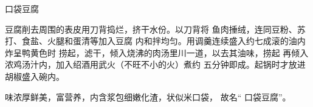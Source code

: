 \begin{recipe}{口袋豆腐}

\ingredients




\cooking

豆腐削去周围的表皮用刀背捣烂，挤干水份。以刀背将 鱼肉捶绒，连同豆粉、苏打、食盐、火腿和蛋清等加入豆腐 内和拌均匀。用调羹连续盛入约七成滚的油内炸呈鸭黄色时 捞起，滤干，倾入烧沸的肉汤里川一道，以去其油味，捞起 再倾入浓鸡汤汁内，加入绍酒用武火（不旺不小的火）煮约 五分钟即成。起锅时才放进胡椒盛入碗内。

\notes

味浓厚鲜美，富营养，内含浆包细嫩化渣，状似米口袋， 故名“ 口袋豆腐”。

\end{recipe}

